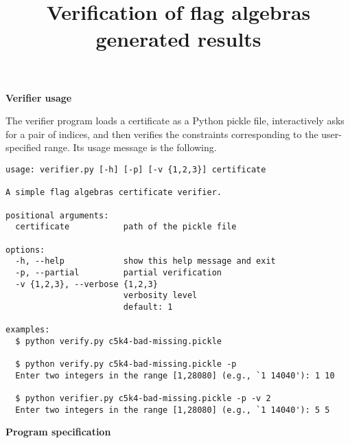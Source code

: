 \documentclass[11pt,a4paper,reqno]{amsart}
\begin{document}
\title[Verification of flag algebras generated results]{Verification of flag algebras generated results}

\maketitle

\textbf{\large Verifier usage}

The verifier program loads a certificate as a Python pickle file, interactively asks
for a pair of indices, and then verifies the constraints corresponding to the
user-specified range. Its usage message is the following.

\begin{Verbatim}[frame=single, fontsize=\small]
usage: verifier.py [-h] [-p] [-v {1,2,3}] certificate

A simple flag algebras certificate verifier.

positional arguments:
  certificate           path of the pickle file

options:
  -h, --help            show this help message and exit
  -p, --partial         partial verification
  -v {1,2,3}, --verbose {1,2,3}
                        verbosity level
                        default: 1

examples:
  $ python verify.py c5k4-bad-missing.pickle

  $ python verify.py c5k4-bad-missing.pickle -p
  Enter two integers in the range [1,28080] (e.g., `1 14040'): 1 10

  $ python verifier.py c5k4-bad-missing.pickle -p -v 2
  Enter two integers in the range [1,28080] (e.g., `1 14040'): 5 5
\end{Verbatim}

\textbf{\large Program specification}
\end{document}
